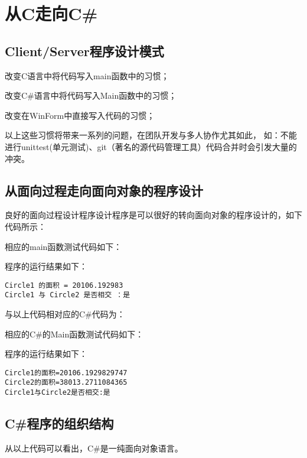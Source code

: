 ﻿%

\chapter{从C走向C\#}

\section{Client/Server程序设计模式}
改变C语言中将代码写入main函数中的习惯；

改变C\#语言中将代码写入Main函数中的习惯；

改变在WinForm中直接写入代码的习惯；

以上这些习惯将带来一系列的问题，在团队开发与多人协作尤其如此，
如：不能进行unittest(单元测试)、git（著名的源代码管理工具）代码合并时会引发大量的冲突。

\section{从面向过程走向面向对象的程序设计 }

良好的面向过程设计程序设计程序是可以很好的转向面向对象的程序设计的，如下代码所示：
 
 




% 
% 
% 

相应的main函数测试代码如下：


程序的运行结果如下：
\begin{verbatim}
Circle1 的面积 = 20106.192983
Circle1 与 Circle2 是否相交 ：是
\end{verbatim}



与以上代码相对应的C\#代码为：


相应的C\#的Main函数测试代码如下：


程序的运行结果如下：
\begin{verbatim}
Circle1的面积=20106.1929829747
Circle2的面积=38013.2711084365
Circle1与Circle2是否相交:是
\end{verbatim}

\section{ C\#程序的组织结构}

 从以上代码可以看出，C\#是一纯面向对象语言。